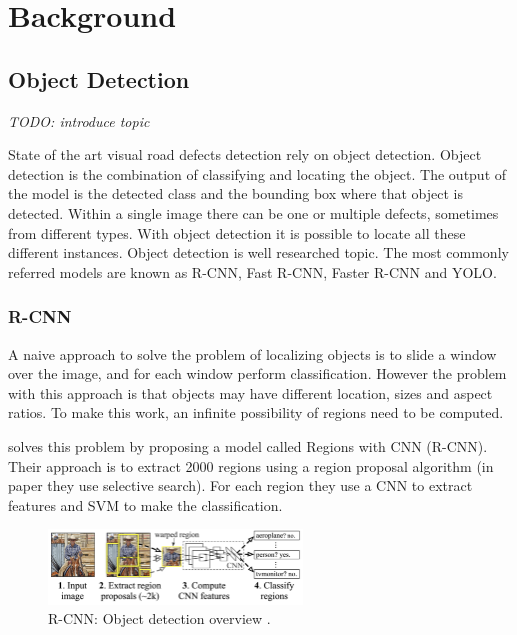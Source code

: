 \clearpage
\section{Background}


\subsection{Object Detection}
\label{sec:object-detection}

\textit{TODO: introduce topic}

State of the art visual road defects detection rely on object detection. Object detection is the combination of classifying and locating the object. The output of the model is the detected class and the bounding box where that object is detected. Within a single image there can be one or multiple defects, sometimes from different types. With object detection it is possible to locate all these different instances. Object detection is well researched topic. The most commonly referred models are known as R-CNN, Fast R-CNN, Faster R-CNN and YOLO.


\subsubsection{R-CNN}
A naive approach to solve the problem of localizing objects is to slide a window over the image, and for each window perform classification. However the problem with this approach is that objects may have different location, sizes and aspect ratios. To make this work, an infinite possibility of regions need to be computed. 

 solves this problem by proposing a model called Regions with CNN (R-CNN). Their approach is to extract 2000 regions using a region proposal algorithm (in paper they use selective search). For each region they use a CNN to extract features and SVM to make the classification. 

\begin{figure}[ht]
\begin{center}
\includegraphics[height=2cm,keepaspectratio]{images/2_literature/r-cnn.png}
\end{center}
\caption{R-CNN: Object detection overview \cite{Girshick2013}.}
\end{figure}

